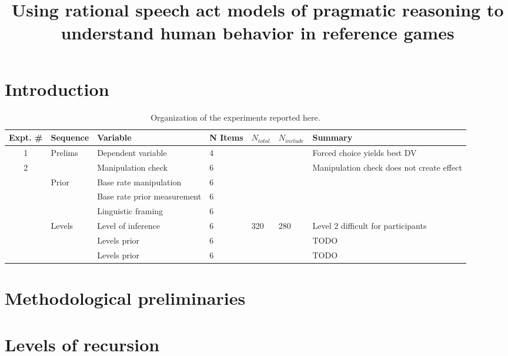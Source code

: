 \documentclass[man,noapacite]{apa2}
\title{\vspace{-16ex}Using rational speech act models of pragmatic reasoning to understand human behavior in reference games}
\begin{document}
\maketitle                            


\section{Introduction}







\begin{table}[ht]
\caption{Organization of the experiments reported here.}
\begin{tabular}{cllllll}
\hline
Expt. \# & Sequence & Variable & N Items & $N_{total}$ & $N_{include}$ & Summary \\
\hline
1 & Prelims & Dependent variable & 4 & & & Forced choice yields best DV \\
2 & & Manipulation check & 6 & & & Manipulation check does not create effect \\

& Prior & Base rate manipulation & 6 & & & \\
&  & Base rate prior measurement & 6 & & & \\
&  & Linguistic framing & 6 & & & \\
 & Levels & Level of inference & 6 & 320 & 280 & Level 2 difficult for participants \\
 &    & Levels prior & 6 &  & & TODO \\
 &    & Levels prior & 6 &  & & TODO \\



\hline
\end{tabular}
\end{table}

\section{Methodological preliminaries}



\section{Levels of recursion}
\end{document}
